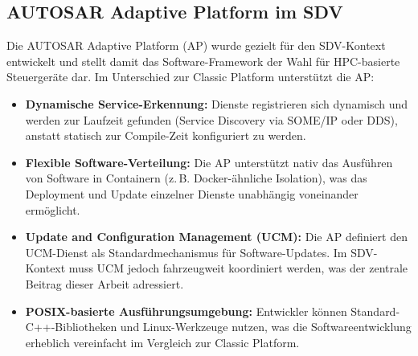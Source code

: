 ﻿\documentclass[12pt,a4paper,twoside]{article}
\begin{document}
\subsection{AUTOSAR Adaptive Platform im SDV}
\label{subsec:autosar_adaptive_sdv}

Die AUTOSAR Adaptive Platform (AP) wurde gezielt für den SDV-Kontext entwickelt
und stellt damit das Software-Framework der Wahl für HPC-basierte Steuergeräte dar.
Im Unterschied zur Classic Platform unterstützt die AP:

\begin{itemize}
  \item \textbf{Dynamische Service-Erkennung:} Dienste registrieren sich dynamisch
    und werden zur Laufzeit gefunden (Service Discovery via SOME/IP oder DDS),
    anstatt statisch zur Compile-Zeit konfiguriert zu werden.
  \item \textbf{Flexible Software-Verteilung:} Die AP unterstützt nativ das
    Ausführen von Software in Containern (z.\,B. Docker-ähnliche Isolation), was
    das Deployment und Update einzelner Dienste unabhängig voneinander ermöglicht.
  \item \textbf{Update and Configuration Management (UCM):} Die AP definiert
    den UCM-Dienst als Standardmechanismus für Software-Updates. Im SDV-Kontext
    muss UCM jedoch fahrzeugweit koordiniert werden, was der zentrale Beitrag
    dieser Arbeit adressiert.
  \item \textbf{POSIX-basierte Ausführungsumgebung:} Entwickler können Standard-
    C++-Bibliotheken und Linux-Werkzeuge nutzen, was die Softwareentwicklung
    erheblich vereinfacht im Vergleich zur Classic Platform.
\end{itemize}
\end{document}
